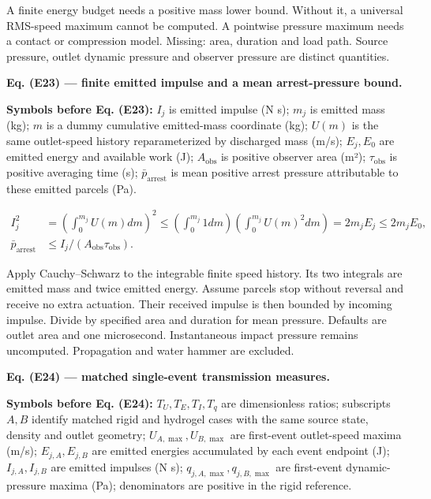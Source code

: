 \documentclass[11pt]{article}
\begin{document}
A finite energy budget needs a positive mass lower bound. Without it, a universal RMS-speed maximum cannot be computed. A pointwise pressure maximum needs a contact or compression model. Missing: area, duration and load path. Source pressure, outlet dynamic pressure and observer pressure are distinct quantities.


\textbf{Eq. (E23) — finite emitted impulse and a mean arrest-pressure bound.}


\textbf{Symbols before Eq. (E23):} \(I_j\) is emitted impulse (N s); \(m_j\) is emitted mass (kg); \(m\) is a dummy cumulative emitted-mass coordinate (kg); \(U(m)\) is the same outlet-speed history reparameterized by discharged mass (m/s); \(E_j,E_0\) are emitted energy and available work (J); \(A_{\mathrm{obs}}\) is positive observer area (m²); \(\tau_{\mathrm{obs}}\) is positive averaging time (s); \(\bar p_{\mathrm{arrest}}\) is mean positive arrest pressure attributable to these emitted parcels (Pa).



\begin{equation*}
\begin{aligned}
I_j^2&=\left(\int_0^{m_j}U(m)dm\right)^2
\le\left(\int_0^{m_j}1dm\right)\left(\int_0^{m_j}U(m)^2dm\right)
=2m_jE_j\le2m_jE_0,\\
\bar p_{\mathrm{arrest}}&\le I_j/(A_{\mathrm{obs}}\tau_{\mathrm{obs}}).
\end{aligned}
\end{equation*}

Apply Cauchy–Schwarz to the integrable finite speed history. Its two integrals are emitted mass and twice emitted energy. Assume parcels stop without reversal and receive no extra actuation. Their received impulse is then bounded by incoming impulse. Divide by specified area and duration for mean pressure. Defaults are outlet area and one microsecond. Instantaneous impact pressure remains uncomputed. Propagation and water hammer are excluded.


\textbf{Eq. (E24) — matched single-event transmission measures.}


\textbf{Symbols before Eq. (E24):} \(T_U,T_E,T_I,T_q\) are dimensionless ratios; subscripts \(A,B\) identify matched rigid and hydrogel cases with the same source state, density and outlet geometry; \(U_{A,\max},U_{B,\max}\) are first-event outlet-speed maxima (m/s); \(E_{j,A},E_{j,B}\) are emitted energies accumulated by each event endpoint (J); \(I_{j,A},I_{j,B}\) are emitted impulses (N s); \(q_{j,A,\max},q_{j,B,\max}\) are first-event dynamic-pressure maxima (Pa); denominators are positive in the rigid reference.
\end{document}
